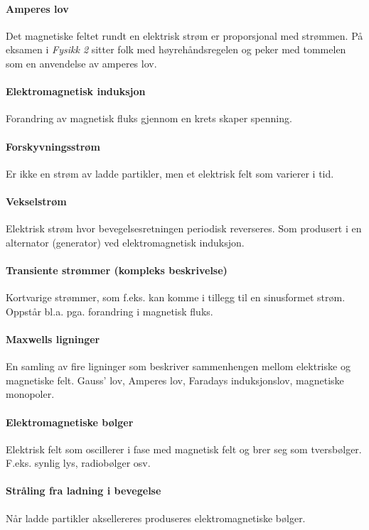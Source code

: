 \paragraph{Amperes lov}
  Det magnetiske feltet rundt en elektrisk strøm er proporsjonal med strømmen.
  På eksamen i \emph{Fysikk 2} sitter folk med høyrehåndsregelen og
  peker med tommelen som en anvendelse av amperes lov.
\paragraph{Elektromagnetisk induksjon}
  Forandring av magnetisk fluks gjennom en krets skaper spenning.
\paragraph{Forskyvningsstrøm}
  Er ikke en strøm av ladde partikler, men et elektrisk felt som varierer i tid.
\paragraph{Vekselstrøm}
  Elektrisk strøm hvor bevegelsesretningen periodisk reverseres.
  Som produsert i en alternator (generator) ved elektromagnetisk induksjon.
\paragraph{Transiente strømmer (kompleks beskrivelse)}
  Kortvarige strømmer, som f.eks. kan komme i tillegg til en sinusformet strøm.
  Oppstår bl.a. pga. forandring i magnetisk fluks.
\paragraph{Maxwells ligninger}
  En samling av fire ligninger som beskriver sammenhengen mellom elektriske og
  magnetiske felt.
  Gauss' lov, Amperes lov, Faradays induksjonslov, magnetiske monopoler.
\paragraph{Elektromagnetiske bølger}
  Elektrisk felt som oscillerer i fase med magnetisk felt og brer seg
  som tversbølger.
  F.eks. synlig lys, radiobølger osv.
\paragraph{Stråling fra ladning i bevegelse}
  Når ladde partikler aksellereres produseres elektromagnetiske bølger.
